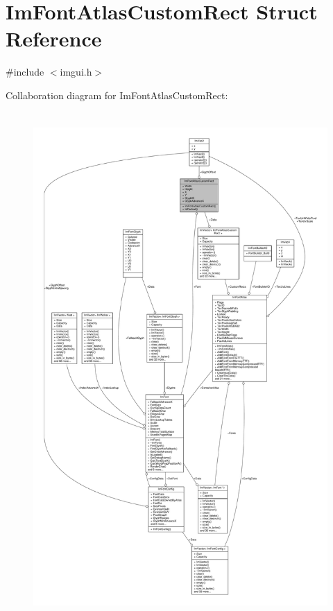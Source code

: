 \hypertarget{structImFontAtlasCustomRect}{}\section{Im\+Font\+Atlas\+Custom\+Rect Struct Reference}
\label{structImFontAtlasCustomRect}


{\ttfamily \#include $<$imgui.\+h$>$}



Collaboration diagram for Im\+Font\+Atlas\+Custom\+Rect\+:
\nopagebreak
\begin{figure}[H]
\begin{center}
\leavevmode
\includegraphics[height=550pt]{structImFontAtlasCustomRect__coll__graph}
\end{center}
\end{figure}
